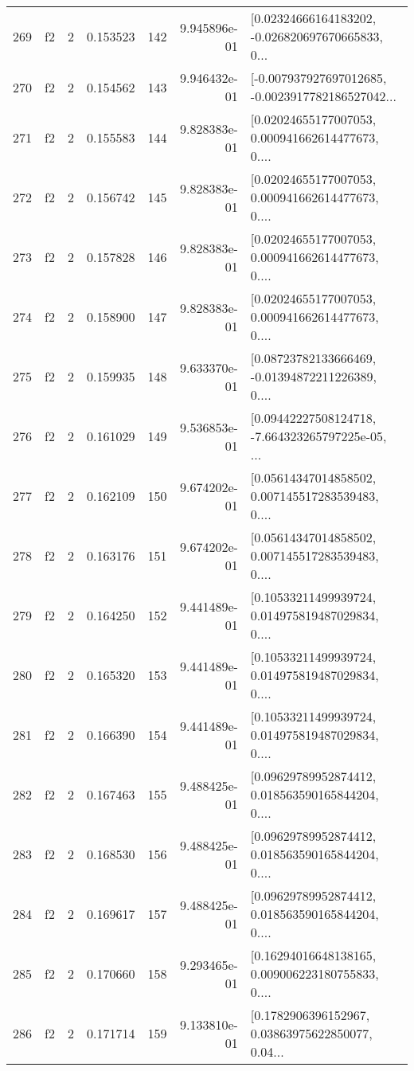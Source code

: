 \begin{tabular}{lllrlrl}
269 &  f2 &   2 &  0.153523 &  142 &  9.945896e-01 &  [0.02324666164183202, -0.026820697670665833, 0... \\
270 &  f2 &   2 &  0.154562 &  143 &  9.946432e-01 &  [-0.007937927697012685, -0.0023917782186527042... \\
271 &  f2 &   2 &  0.155583 &  144 &  9.828383e-01 &  [0.02024655177007053, 0.000941662614477673, 0.... \\
272 &  f2 &   2 &  0.156742 &  145 &  9.828383e-01 &  [0.02024655177007053, 0.000941662614477673, 0.... \\
273 &  f2 &   2 &  0.157828 &  146 &  9.828383e-01 &  [0.02024655177007053, 0.000941662614477673, 0.... \\
274 &  f2 &   2 &  0.158900 &  147 &  9.828383e-01 &  [0.02024655177007053, 0.000941662614477673, 0.... \\
275 &  f2 &   2 &  0.159935 &  148 &  9.633370e-01 &  [0.08723782133666469, -0.01394872211226389, 0.... \\
276 &  f2 &   2 &  0.161029 &  149 &  9.536853e-01 &  [0.09442227508124718, -7.664323265797225e-05, ... \\
277 &  f2 &   2 &  0.162109 &  150 &  9.674202e-01 &  [0.05614347014858502, 0.007145517283539483, 0.... \\
278 &  f2 &   2 &  0.163176 &  151 &  9.674202e-01 &  [0.05614347014858502, 0.007145517283539483, 0.... \\
279 &  f2 &   2 &  0.164250 &  152 &  9.441489e-01 &  [0.10533211499939724, 0.014975819487029834, 0.... \\
280 &  f2 &   2 &  0.165320 &  153 &  9.441489e-01 &  [0.10533211499939724, 0.014975819487029834, 0.... \\
281 &  f2 &   2 &  0.166390 &  154 &  9.441489e-01 &  [0.10533211499939724, 0.014975819487029834, 0.... \\
282 &  f2 &   2 &  0.167463 &  155 &  9.488425e-01 &  [0.09629789952874412, 0.018563590165844204, 0.... \\
283 &  f2 &   2 &  0.168530 &  156 &  9.488425e-01 &  [0.09629789952874412, 0.018563590165844204, 0.... \\
284 &  f2 &   2 &  0.169617 &  157 &  9.488425e-01 &  [0.09629789952874412, 0.018563590165844204, 0.... \\
285 &  f2 &   2 &  0.170660 &  158 &  9.293465e-01 &  [0.16294016648138165, 0.009006223180755833, 0.... \\
286 &  f2 &   2 &  0.171714 &  159 &  9.133810e-01 &  [0.1782906396152967, 0.03863975622850077, 0.04... \\

\end{tabular}

